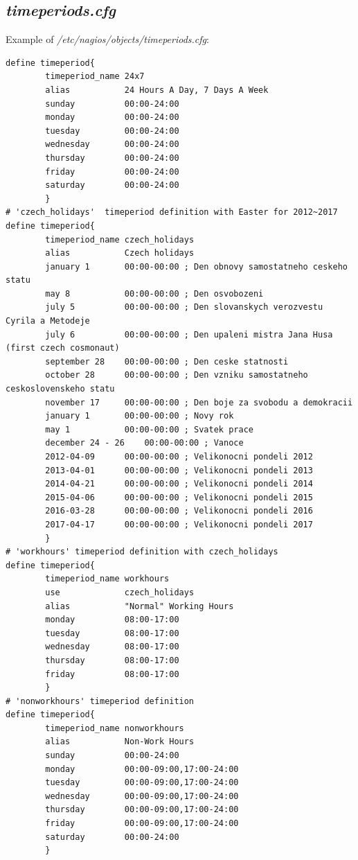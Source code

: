 \documentclass[10pt,a4paper,final]{report}
\begin{document}
\subsection{\emph{timeperiods.cfg}}
Example of \emph{/etc/nagios/objects/timeperiods.cfg}:
\begin{lstlisting}
define timeperiod{
        timeperiod_name 24x7
        alias           24 Hours A Day, 7 Days A Week
        sunday          00:00-24:00
        monday          00:00-24:00
        tuesday         00:00-24:00
        wednesday       00:00-24:00
        thursday        00:00-24:00
        friday          00:00-24:00
        saturday        00:00-24:00
        }
# 'czech_holidays'  timeperiod definition with Easter for 2012~2017
define timeperiod{
        timeperiod_name czech_holidays
        alias           Czech holidays
        january 1       00:00-00:00 ; Den obnovy samostatneho ceskeho statu
        may 8           00:00-00:00 ; Den osvobozeni
        july 5          00:00-00:00 ; Den slovanskych verozvestu Cyrila a Metodeje
        july 6          00:00-00:00 ; Den upaleni mistra Jana Husa (first czech cosmonaut)
        september 28    00:00-00:00 ; Den ceske statnosti
        october 28      00:00-00:00 ; Den vzniku samostatneho ceskoslovenskeho statu
        november 17     00:00-00:00 ; Den boje za svobodu a demokracii
        january 1       00:00-00:00 ; Novy rok
        may 1           00:00-00:00 ; Svatek prace
        december 24 - 26    00:00-00:00 ; Vanoce
        2012-04-09      00:00-00:00 ; Velikonocni pondeli 2012
        2013-04-01      00:00-00:00 ; Velikonocni pondeli 2013
        2014-04-21      00:00-00:00 ; Velikonocni pondeli 2014
        2015-04-06      00:00-00:00 ; Velikonocni pondeli 2015
        2016-03-28      00:00-00:00 ; Velikonocni pondeli 2016
        2017-04-17      00:00-00:00 ; Velikonocni pondeli 2017	
        }
# 'workhours' timeperiod definition with czech_holidays
define timeperiod{
        timeperiod_name workhours
        use				czech_holidays
        alias           "Normal" Working Hours
        monday          08:00-17:00
        tuesday         08:00-17:00
        wednesday       08:00-17:00
        thursday        08:00-17:00
        friday          08:00-17:00
        }
# 'nonworkhours' timeperiod definition
define timeperiod{
        timeperiod_name nonworkhours
        alias           Non-Work Hours
        sunday          00:00-24:00
        monday          00:00-09:00,17:00-24:00
        tuesday         00:00-09:00,17:00-24:00
        wednesday       00:00-09:00,17:00-24:00
        thursday        00:00-09:00,17:00-24:00
        friday          00:00-09:00,17:00-24:00
        saturday        00:00-24:00
        }
\end{lstlisting}
\end{document}
